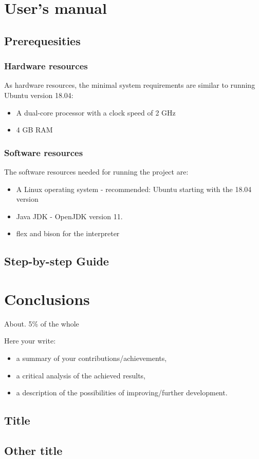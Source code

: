 \documentclass[12pt,a4paper,twoside]{report}
\begin{document}
\chapter{User's manual}

\section{Prerequesities}

\subsection{Hardware resources}

As hardware resources, the minimal system requirements are similar to running Ubuntu version 18.04:
\begin{itemize}
\item A dual-core processor with a clock speed of 2 GHz
\item 4 GB RAM
\end{itemize}

\subsection{Software resources}

The software resources needed for running the project are:
\begin{itemize}
	\item A Linux operating system - recommended: Ubuntu starting with the 18.04 version
	\item Java JDK - OpenJDK version 11. 
	\item flex and bison for the interpreter
\end{itemize}
\section{Step-by-step Guide}

\chapter{Conclusions}

About. 5\% of the whole

Here your write:
\begin{itemize}
\item a summary of your contributions/achievements,
\item a critical analysis of the achieved results,
\item a description of the possibilities of improving/further development.
\end{itemize}
\section{Title}
\section{Other title}


 


\end{document}
